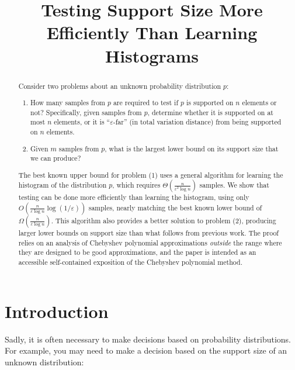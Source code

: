 \documentclass{theoretics}
\title{Testing Support Size More Efficiently Than Learning Histograms}
\renewcommand{\epsilon}{\varepsilon}
\begin{document}
\date{}

\maketitle

\begin{abstract}
Consider two problems about an unknown probability distribution $p$:
\begin{enumerate}
\item How many samples from $p$ are required to test if $p$ is
supported on $n$ elements or not? Specifically, given samples from $p$, determine
whether it is supported on at most $n$ elements, or it is ``$\epsilon$-far'' (in total
variation distance) from being supported on $n$ elements.
\item Given $m$ samples from $p$, what is the largest lower bound on its support size
that we can produce?
\end{enumerate}
The best known upper bound for problem (1) uses a general algorithm for learning the histogram of
the distribution $p$, which requires $\Theta(\tfrac{n}{\epsilon^2 \log n})$ samples. We show that
testing can be done more efficiently than learning the histogram, using only $O(\tfrac{n}{\epsilon
\log n} \log(1/\epsilon))$ samples, nearly matching the best known lower bound of
$\Omega(\tfrac{n}{\epsilon \log n})$. This algorithm also provides a better solution to problem (2),
producing larger lower bounds on support size than what follows from previous work. The proof relies
on an analysis of Chebyshev polynomial approximations \emph{outside} the range where they are
designed to be good approximations, and the paper is intended as an accessible self-contained
exposition of the Chebyshev polynomial method.
\end{abstract}



\section{Introduction}

Sadly, it is often necessary to make decisions based on probability distributions. For example, you
may need to make a decision based on the support size of an unknown distribution:
\end{document}
